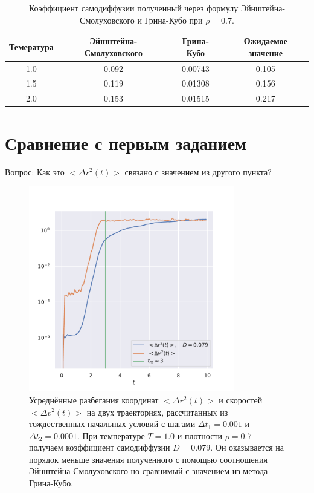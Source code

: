 \documentclass[a4paper,12pt]{article}
\begin{document}
\begin{table}[H]
    \centering
    \caption{Коэффициент самодиффузии полученный через
    формулу Эйнштейна-Смолуховского и Грина-Кубо при 
\(\rho = 0.7\).}
    \label{tab:label}
    \begin{tabular}{|c | c | c | c |}
        \hline
        Темература & Эйнштейна-Смолуховского & Грина-Кубо 
                   & Ожидаемое значение\\
        \hline
        \hline
        1.0 & 0.092 & 0.00743 & {\color{red}0.105} \\
        1.5 & 0.119 & 0.01308 & {\color{red}0.156} \\
        2.0 & 0.153 & 0.01515 & {\color{red}0.217} \\
        \hline
    \end{tabular}
\end{table}

\section{Сравнение с первым заданием}

{\color{red} Вопрос: Как это \(<\Delta r^2(t)>\)
связано с значением из другого пункта?}

\begin{figure}[H]
    \centering
    \includegraphics[width=0.8\textwidth]{../../media/tm.pdf}
\caption{Усреднённые разбегания координат \(<\Delta r^2(t)>\) 
и скоростей \(<\Delta v^2(t)>\) на двух траекториях,
рассчитанных из тождественных начальных условий с 
шагами \(\Delta t_1 = 0.001\) и \(\Delta t_2 = 0.0001\).
При температуре \(T = 1.0\) и плотности 
\(\rho = 0.7\) получаем коэффициент
самодиффузии \(D = 0.079\). Он оказывается на порядок
меньше значения полученного с помощью соотношения
Эйнштейна-Смолуховского но сравнимый с значением из
метода Грина-Кубо.}
\end{figure}
\end{document}
